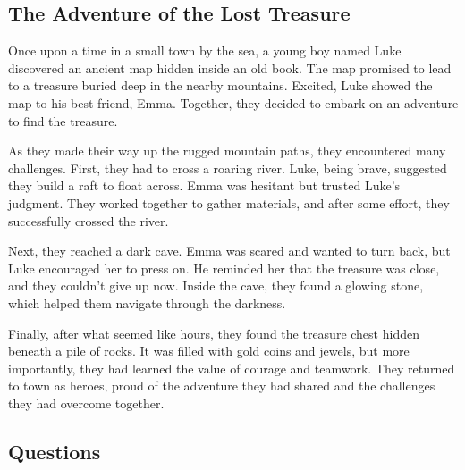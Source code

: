 \documentclass[12pt]{article}
\begin{document}
\onehalfspacing

\subsection*{The Adventure of the Lost Treasure}

\begin{tcolorbox}[colframe=black!40, colback=gray!5]

\begin{spacing}{1.15}

Once upon a time in a small town by the sea, a young boy named Luke discovered an ancient map hidden inside an old book. The map promised to lead to a treasure buried deep in the nearby mountains. Excited, Luke showed the map to his best friend, Emma. Together, they decided to embark on an adventure to find the treasure.

As they made their way up the rugged mountain paths, they encountered many challenges. First, they had to cross a roaring river. Luke, being brave, suggested they build a raft to float across. Emma was hesitant but trusted Luke’s judgment. They worked together to gather materials, and after some effort, they successfully crossed the river.

Next, they reached a dark cave. Emma was scared and wanted to turn back, but Luke encouraged her to press on. He reminded her that the treasure was close, and they couldn’t give up now. Inside the cave, they found a glowing stone, which helped them navigate through the darkness.

Finally, after what seemed like hours, they found the treasure chest hidden beneath a pile of rocks. It was filled with gold coins and jewels, but more importantly, they had learned the value of courage and teamwork. They returned to town as heroes, proud of the adventure they had shared and the challenges they had overcome together.

\end{spacing}

\end{tcolorbox}

\subsection*{Questions}
\end{document}
